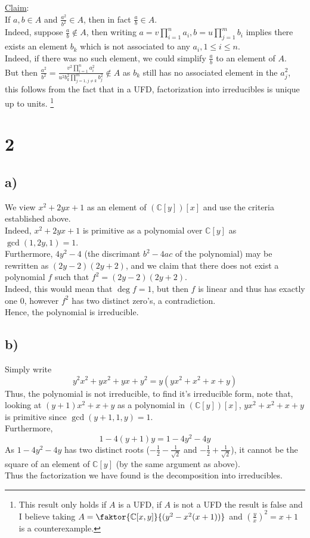 \documentclass[11pt, a4paper]{article}
\begin{document}
\underline{Claim}:\\
If $ a,b \in A$ and $ \frac{a^{2}}{b^{2}}\in A$, then in fact $ \frac{a}{b}\in A$.\\
Indeed, suppose $ \frac{a}{b}\notin A$, then writing $ a= v \prod_{i=1}^{n} a_i, b = u \prod_{j=1}^{m}b_i$ implies there exists an element $b_k$ which is not associated to any $ a_i, 1 \leq i \leq n$.\\
Indeed, if there was no such element, we could simplify $ \frac{a}{b}$ to an element of $A$. \\
But then $ \frac{a^{2}}{b^{2}}= \frac{ v^{2}\prod_{i=1 }^{n}a_i^{2}}{ u ^{2} b_k ^{2} \prod_{j=1,j \neq k }^{m}b_j^{2}}\notin A$ as $ b_k$ still has no associated element in the $ a_j^{2}$, this follows from the fact that in a UFD, factorization into irreducibles is unique up to units.
\footnote{This result only holds if $ A$ is a UFD, if $A$ is not a UFD the result is false and I believe taking $ A=\faktor{\mathbb{C}[x,y]}{ ( y^{2}- x^{2}( x+1) ) }$ and $ ( \frac{y}{x} )^{2}= x+1$ is a counterexample.}
\section*{2}
\subsection*{a)}
We view $ x^{2}+ 2yx + 1$ as an element of $ ( \mathbb{C}[y] ) [ x] $ and use the criteria established above.\\
Indeed, $ x^{2}+ 2yx +1$ is primitive as a polynomial over $ \mathbb{C}[y]$ as $ \gcd( 1, 2y,1) = 1$.\\
Furthermore, $ 4y^{2}-4$ (the discrimant $ b^{2}-4ac$ of the polynomial)  may be rewritten as $ ( 2y-2) ( 2y+2) $, and we claim that there does not exist a polynomial $f$ such that $ f^{2}= ( 2y-2) ( 2y+2) $.\\
Indeed, this would mean that $ \deg f = 1$, but then $f$ is linear and thus has exactly one 0, however $f^{2}$ has two distinct zero's, a contradiction.\\
Hence, the polynomial is irreducible.
\subsection*{b)}
Simply write
\[ 
y^{2}x^{2} + yx^{2} + yx + y^{2} = y ( yx^{2} + x^{2} + x + y) 
\]
Thus, the polynomial is not irreducible, to find it's irreducible form, note that, looking at $ ( y+1) x^{2} +x +y$ as a polynomial in $(  \mathbb{C}[y] )[x]$, $yx^{2}+x^{2}+x+y$ is primitive since $\gcd( y+1,1,y) =1$.\\
Furthermore,
\[ 
1- 4 ( y+1) y = 1 - 4y^{2}-4y
\]
As $ 1- 4y^{2}-4y$ has two distinct roots ($ -\frac{1}{2 }- \frac{1}{ \sqrt{2} }$ and $ -\frac{1}{2}+ \frac{1}{\sqrt{2} }$), it cannot be the square of an element of $ \mathbb{C}[y]$ (by the same argument as above).\\
Thus the factorization we have found is the decomposition into irreducibles.
\end{document}
